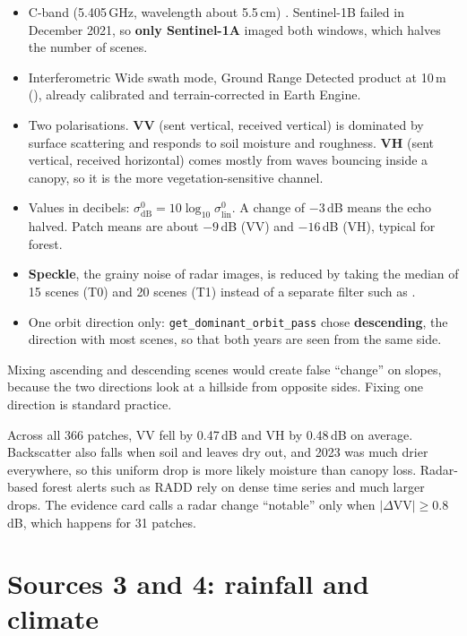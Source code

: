 \begin{itemize}
  \item C-band (5.405\,GHz, wavelength about 5.5\,cm) \citep{torres2012}. Sentinel-1B failed in December 2021, so \textbf{only Sentinel-1A} imaged both windows, which halves the number of scenes.
  \item Interferometric Wide swath mode, Ground Range Detected product at 10\,m (), already calibrated and terrain-corrected in Earth Engine.
  \item Two polarisations. \textbf{VV} (sent vertical, received vertical) is dominated by surface scattering and responds to soil moisture and roughness. \textbf{VH} (sent vertical, received horizontal) comes mostly from waves bouncing inside a canopy, so it is the more vegetation-sensitive channel.
  \item Values in decibels: $\sigma^0_{\mathrm{dB}} = 10\log_{10}\sigma^0_{\mathrm{lin}}$. A change of $-3$\,dB means the echo halved. Patch means are about $-9$\,dB (VV) and $-16$\,dB (VH), typical for forest.
  \item \textbf{Speckle}, the grainy noise of radar images, is reduced by taking the median of 15 scenes (T0) and 20 scenes (T1) instead of a separate filter such as \citet{lee1980}.
  \item One orbit direction only: \texttt{get\_dominant\_orbit\_pass} chose \textbf{descending}, the direction with most scenes, so that both years are seen from the same side.
\end{itemize}

\begin{whybox}
Mixing ascending and descending scenes would create false ``change'' on slopes, because the two directions look at a hillside from opposite sides. Fixing one direction is standard practice.
\end{whybox}

\begin{watchout}
Across all 366 patches, VV fell by 0.47\,dB and VH by 0.48\,dB on average. Backscatter also falls when soil and leaves dry out, and 2023 was much drier everywhere, so this uniform drop is more likely moisture than canopy loss. Radar-based forest alerts such as RADD \citep{reiche2021} rely on dense time series and much larger drops. The evidence card calls a radar change ``notable'' only when $|\Delta\mathrm{VV}| \ge 0.8$\,dB, which happens for 31 patches.
\end{watchout}

\section{Sources 3 and 4: rainfall and climate}
\label{sec:climate}

